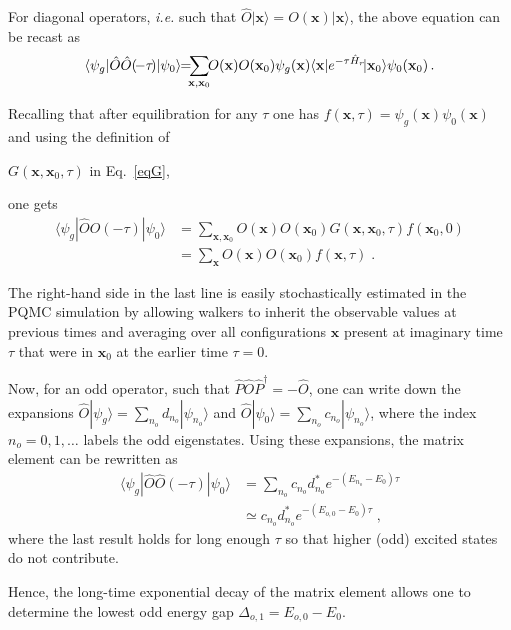 \documentclass[aps,prl,twocolumn,superscriptaddress,nofootinbib]{revtex4-2}
\begin{document}
For diagonal operators, \emph{i.e.} such that $\hat{O}|{\mathbf x}\rangle=O(\mathbf x)|{\mathbf x}\rangle$, the above equation can be recast as
\begin{equation}
\langle\psi_g|\hat{O}\hat{O}(\!-\tau\!)|\psi_0\rangle\!\!
=\!\!\!
\sum_{{\mathbf x},{\mathbf x}_0}\!\!O(\mathbf x)O({\mathbf x}_0) \psi_g({\bf x})
\langle{\mathbf x}|e^{-\tau \hat{H}_r}\!|{\mathbf x}_0\rangle \psi_0({\mathbf x}_0) \,.
\nonumber
\end{equation}

Recalling that after equilibration for any $\tau$ one has $f({\mathbf x},\tau)=\psi_g(\mathbf{x})\psi_0(\mathbf{x})$ and using the definition of

$G({\mathbf x},{\mathbf x}_0,\tau)$ in Eq.~\eqref{eqG},

one gets
\begin{align}
\langle\psi_g|\hat{O}\hat{O}(-\tau)|\psi_0\rangle
& =
\sum_{{\mathbf x},{\mathbf x}_0} O({\mathbf x})O({\mathbf x}_0)
G({\mathbf x},{\mathbf x}_0,\tau)f({\mathbf x_0},0)\nonumber\\
& = \sum_{{\mathbf x}} O({\mathbf x})O({\mathbf x}_0)
f({\mathbf x},\tau)
\;.
\label{MCcorrelator}
\end{align}

The right-hand side in the last line is easily stochastically estimated in the PQMC simulation by allowing walkers to inherit the observable values at previous times and  averaging over all configurations ${\mathbf x}$ present at imaginary time $\tau$ that were in ${\mathbf x}_0$ at the earlier time $\tau=0$.


Now, for an odd operator, such that $\hat{P}\hat{O}\hat{P}^{\dagger}=-\hat{O}$, one can write down the expansions
$\hat{O}|\psi_g\rangle= \sum_{n_o} d_{n_o} |\psi_{n_o}\rangle$ and $\hat{O}|\psi_0\rangle= \sum_{n_o} c_{n_o} |\psi_{n_o}\rangle$, where the index $n_o=0,1,\dots$ labels the odd eigenstates.
Using these expansions, the matrix element can be rewritten as
\begin{align*}
\langle\psi_g|\hat{O}\hat{O}(-\tau)|\psi_0\rangle
&=\sum_{n_o}c_{n_o}d^*_{n_o}e^{-(E_{n_o}-E_0)\tau}\\
& \simeq c_{n_o}d^*_{n_o}e^{-(E_{o,0}-E_0)\tau} \;,
\label{eq6}
\end{align*}
where the last result holds for long enough $\tau$ so that higher (odd) excited states do not contribute.

Hence, the long-time exponential decay of the matrix element allows one to determine the lowest odd energy gap $\Delta_{o,1}=E_{o,0}-E_{0}$.
\end{document}
